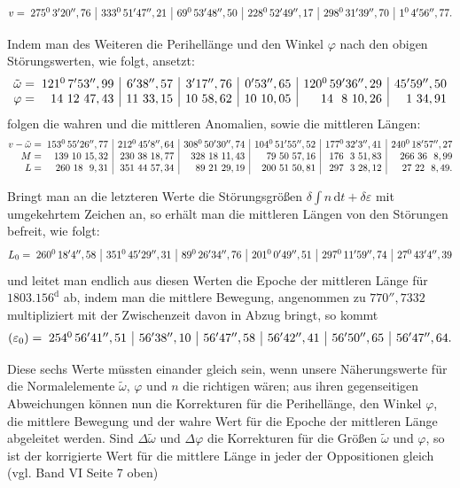 \begin{landscape}
\[\begin{array}{@{}r@{\;}r|r|r|r|r|r@{}}
v={}&275^{0}\,3'20'',76 & 333^{0}\,51'47'',21 & 69^{0}\,53'48'',50 & 228^{0}\,52'49'',17 & 298^{0}\,31'39'',70 & 1^{0}\,4'56'',77.
\end{array}\]
\par
Indem man des Weiteren die Perihellänge und den Winkel \(\varphi\) nach den obigen Störungswerten, wie folgt, ansetzt:
\[\begin{array}{@{}r@{\;}r|r|r|r|r|r@{}}
\tilde\omega={}&121^{0}\,7'53'',99 & 6'38'',57 & 3'17'',76 & 0'53'',65 & 120^{0}\,59'36'',29 & 45'59'',50
\\
\varphi={}&14\ 12\ 47,43 & 11\ 33,15 & 10\ 58,62 & 10\ 10,05 & 14\ \ 8\ 10,26 & 1\ 34,91
\end{array}\]
folgen die wahren und die mittleren Anomalien, sowie die mittleren Längen:
\[\begin{array}{@{}r@{\;}r|r|r|r|r|r@{}}
v-\tilde\omega={}&153^{0}\,55'26'',77 & 212^{0}\,45'8'',64 & 308^{0}\,50'30'',74 & 104^{0}\,51'55'',52 & 177^{0}\,32'3'',41 & 240^{0}\,18'57'',27
\\
M={}&139\ 10\ 15,32 & 230\ 38\ 18,77 & 328\ 18\ 11,43 & 79\ 50\ 57,16 & 176\ \ 3\ 51,83 & 266\ 36\ \ 8,99
\\
L={}&260\ 18\ \ 9,31 & 351\ 44\ 57,34 & 89\ 21\ 29,19 & 200\ 51\ 50,81 & 297\ \ 3\ 28,12 & 27\ 22\ \ 8,49.
\end{array}\]
\par
Bringt man an die letzteren Werte die Störungsgrößen \(\delta\int n\,\mathrm{d}t+\delta\varepsilon\) mit umgekehrtem Zeichen an, so erhält man die mittleren Längen von den Störungen befreit, wie folgt:
\[\begin{array}{@{}r@{\;}r|r|r|r|r|r@{}}
L_0={}&260^{0}\,18'4'',58 & 351^{0}\,45'29'',31 & 89^{0}\,26'34'',76 & 201^{0}\,0'49'',51 & 297^{0}\,11'59'',74 & 27^{0}\,43'4'',39
\end{array}\]
und leitet man endlich aus diesen Werten die Epoche der mittleren Länge für \(1803.156^{\mathrm d}\) ab, indem man die mittlere Bewegung, angenommen zu \(770'',7332\) multipliziert mit der Zwischenzeit davon in Abzug bringt, so kommt
\[\begin{array}{@{}r@{\;}r|r|r|r|r|r@{}}
(\varepsilon_0)={}&254^{0}\,56'41'',51 & 56'38'',10 & 56'47'',58 & 56'42'',41 & 56'50'',65 & 56'47'',64.
\end{array}\]
\par
{}Diese sechs Werte müssten einander gleich sein, wenn unsere Näherungswerte für die Normalelemente \(\tilde\omega\), \(\varphi\) und \(n\) die richtigen wären; aus ihren gegenseitigen Abweichungen können nun die Korrekturen für die Perihellänge, den Winkel \(\varphi\), die mittlere Bewegung und der wahre Wert für die Epoche der mittleren Länge abgeleitet werden. Sind \(\Delta\tilde\omega\) und \(\Delta\varphi\) die Korrekturen für die Größen \(\tilde\omega\) und \(\varphi\), so ist der korrigierte Wert für die mittlere Länge in jeder der Oppositionen gleich (vgl. Band VI Seite 7 oben)

\end{landscape}
